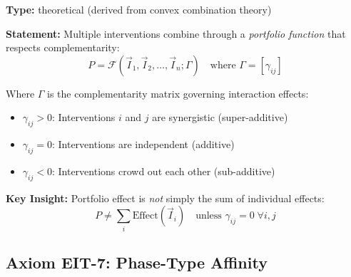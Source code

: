 \begin{tcolorbox}[colback=blue!5!white, colframe=blue!75!black,
    title=\textbf{Axiom EIT-6: Portfolio Composition}]

\textbf{Type:} theoretical (derived from convex combination theory)

\textbf{Statement:} Multiple interventions combine through a \textit{portfolio function} that respects complementarity:
\begin{equation}
\boxed{P = \mathcal{F}(\vec{I}_1, \vec{I}_2, \ldots, \vec{I}_n; \Gamma) \quad \text{where } \Gamma = [\gamma_{ij}]}
\label{eq:ie-portfolio-composition}
\end{equation}

Where $\Gamma$ is the complementarity matrix governing interaction effects:
\begin{itemize}[nosep]
    \item $\gamma_{ij} > 0$: Interventions $i$ and $j$ are synergistic (super-additive)
    \item $\gamma_{ij} = 0$: Interventions are independent (additive)
    \item $\gamma_{ij} < 0$: Interventions crowd out each other (sub-additive)
\end{itemize}

\textbf{Key Insight:} Portfolio effect is \textit{not} simply the sum of individual effects:
\begin{equation}
P \neq \sum_{i} \text{Effect}(\vec{I}_i) \quad \text{unless } \gamma_{ij} = 0 \; \forall i,j
\end{equation}

\end{tcolorbox}

\subsection{Axiom EIT-7: Phase-Type Affinity}

